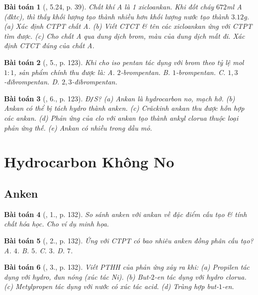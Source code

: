 \documentclass{article}
\newtheorem{baitoan}{Bài toán}
\begin{document}
\begin{baitoan}[\cite{SBT_Hoa_Hoc_11_co_ban}, 5.24, p. 39]
	Chất khí A là 1 xicloankan. Khi đốt cháy $672$\emph{ml} A (đktc), thì thấy khối lượng \emph{} tạo thành nhiều hơn khối lượng nước tạo thành $3.12$\emph{g}. (a) Xác định CTPT chất A. (b) Viết CTCT \& tên các xicloankan ứng với CTPT tìm được. (c) Cho chất A qua dung dịch brom, màu của dung dịch mất đi. Xác định CTCT đúng của chất A.
\end{baitoan}

\begin{baitoan}[\cite{SGK_Hoa_Hoc_11_co_ban}, 5., p. 123]
	Khi cho iso pentan tác dụng với brom theo tỷ lệ mol $1:1$, sản phẩm chính thu được là: {\sf A.} $2$-brompentan. {\sf B.} $1$-brompentan. {\sf C.} $1,3$-đibrompentan. {\sf D.} $2,3$-đibrompentan.
\end{baitoan}

\begin{baitoan}[\cite{SGK_Hoa_Hoc_11_co_ban}, 6., p. 123]
	\emph{Đ\texttt{/}S?} (a) Ankan là hydrocarbon no, mạch hở. (b) Ankan có thể bị tách hydro thành anken. (c) Crăckinh ankan thu được hỗn hợp các ankan. (d) Phản ứng của clo với ankan tạo thành ankyl clorua thuộc loại phản ứng thế. (e) Ankan có nhiều trong dầu mỏ.
\end{baitoan}


\section{Hydrocarbon Không No}

\subsection{Anken}

\begin{baitoan}[\cite{SGK_Hoa_Hoc_11_co_ban}, 1., p. 132]
	So sánh anken với ankan về đặc điểm cấu tạo \& tính chất hóa học. Cho ví dụ minh họa.
\end{baitoan}

\begin{baitoan}[\cite{SGK_Hoa_Hoc_11_co_ban}, 2., p. 132]
	Ứng với CTPT \emph{} có bao nhiêu anken đồng phân cấu tạo? {\sf A.} $4$. {\sf B.} $5$. {\sf C.} $3$. {\sf D.} $7$.
\end{baitoan}

\begin{baitoan}[\cite{SGK_Hoa_Hoc_11_co_ban}, 3., p. 132]
	Viết PTHH của phản ứng xảy ra khi: (a) Propilen tác dụng với hydro, đun nóng (xúc tác \emph{Ni}). (b) But-$2$-en tác dụng với hydro clorua. (c) Metylpropen tác dụng với nước có xúc tác acid. (d) Trùng hợp but-$1$-en.
\end{baitoan}
\end{document}
